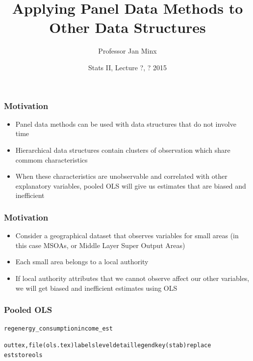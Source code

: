 \documentclass{beamer}
\title 
{Applying Panel Data Methods to Other Data Structures}
\author
{Professor Jan Minx}
\institute
{Hertie School of Governance}
\date
{Stats II, Lecture ?, ? 2015}
\begin{document}
  \frame{\titlepage}

  \begin{frame}
    \frametitle{Motivation}
    \begin{itemize}
      \item Panel data methods can be used with data structures that do not involve time
      \item Hierarchical data structures contain clusters of observation which share commom characteristics
      \item When these characteristics are unobservable and correlated with other explanatory variables, pooled OLS will give us estimates that are biased and inefficient
    \end{itemize}
  \end{frame}
  
  \begin{frame}
    \frametitle{Motivation}
    \begin{itemize}
      \item Consider a geographical dataset that observes variables for small areas (in this case MSOAs, 
      or Middle Layer Super Output Areas)
      \item Each small area belongs to a local authority
      \item If local authority attributes that we cannot observe affect our other variables, we will get biased and inefficient estimates using OLS
    \end{itemize}
  \end{frame}
  
  \begin{frame}
    \frametitle{Pooled OLS}
    \footnotesize
    \begin{alltt}
    reg energy\_consumption income\_est
    
    outtex, file(ols.tex) labels level detail legend key(stab) replace
    est store ols
    \end{alltt}

    
  \end{frame}
  
\end{document}
